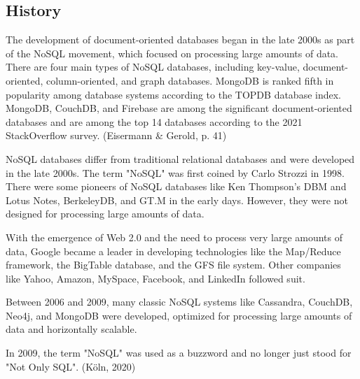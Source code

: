 \subsection{History}

The development of document-oriented databases began in the late 2000s as part of the NoSQL 
movement, which focused on processing large amounts of data. There are four main types of NoSQL 
databases, including key-value, document-oriented, column-oriented, and graph databases. 
MongoDB is ranked fifth in popularity among database systems according to the TOPDB database 
index. MongoDB, CouchDB, and Firebase are among the significant document-oriented databases and 
are among the top 14 databases according to the 2021 StackOverflow survey. 
(Eisermann & Gerold, p. 41)

NoSQL databases differ from traditional relational databases and were developed in the late 2000s.
The term "NoSQL" was first coined by Carlo Strozzi in 1998. There were some pioneers of NoSQL 
databases like Ken Thompson's DBM and Lotus Notes, BerkeleyDB, and GT.M in the early days. 
However, they were not designed for processing large amounts of data.

With the emergence of Web 2.0 and the need to process very large amounts of data, Google became 
a leader in developing technologies like the Map/Reduce framework, the BigTable database, and 
the GFS file system. Other companies like Yahoo, Amazon, MySpace, Facebook, and LinkedIn followed 
suit.

Between 2006 and 2009, many classic NoSQL systems like Cassandra, CouchDB, Neo4j, and MongoDB 
were developed, optimized for processing large amounts of data and horizontally scalable.

In 2009, the term "NoSQL" was used as a buzzword and no longer just stood for "Not Only SQL". 
(Köln, 2020)


